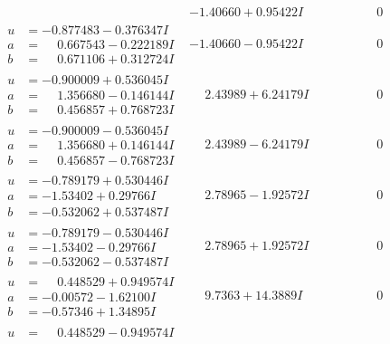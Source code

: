 \documentclass[1p]{elsarticle_modified}
\theoremstyle{definition}
\begin{document}
$$\begin{array}{c|c|c}
 & -1.40660 + 0.95422 I & \phantom{-0.000000 } 0 \\ \hline\begin{aligned}
u &= -0.877483 - 0.376347 I \\
a &= \phantom{-}0.667543 - 0.222189 I \\
b &= \phantom{-}0.671106 + 0.312724 I\end{aligned}
 & -1.40660 - 0.95422 I & \phantom{-0.000000 } 0 \\ \hline\begin{aligned}
u &= -0.900009 + 0.536045 I \\
a &= \phantom{-}1.356680 - 0.146144 I \\
b &= \phantom{-}0.456857 + 0.768723 I\end{aligned}
 & \phantom{-}2.43989 + 6.24179 I & \phantom{-0.000000 } 0 \\ \hline\begin{aligned}
u &= -0.900009 - 0.536045 I \\
a &= \phantom{-}1.356680 + 0.146144 I \\
b &= \phantom{-}0.456857 - 0.768723 I\end{aligned}
 & \phantom{-}2.43989 - 6.24179 I & \phantom{-0.000000 } 0 \\ \hline\begin{aligned}
u &= -0.789179 + 0.530446 I \\
a &= -1.53402 + 0.29766 I \\
b &= -0.532062 + 0.537487 I\end{aligned}
 & \phantom{-}2.78965 - 1.92572 I & \phantom{-0.000000 } 0 \\ \hline\begin{aligned}
u &= -0.789179 - 0.530446 I \\
a &= -1.53402 - 0.29766 I \\
b &= -0.532062 - 0.537487 I\end{aligned}
 & \phantom{-}2.78965 + 1.92572 I & \phantom{-0.000000 } 0 \\ \hline\begin{aligned}
u &= \phantom{-}0.448529 + 0.949574 I \\
a &= -0.00572 - 1.62100 I \\
b &= -0.57346 + 1.34895 I\end{aligned}
 & \phantom{-}9.7363 + 14.3889 I & \phantom{-0.000000 } 0 \\ \hline\begin{aligned}
u &= \phantom{-}0.448529 - 0.949574 I \\

\end{aligned}
\end{array}$$
\end{document}

